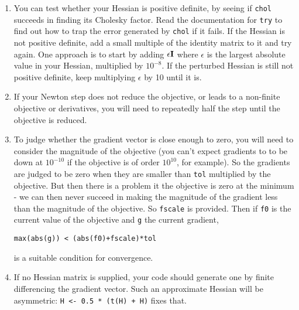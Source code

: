 \documentclass[10pt] {article}
\begin{document}
\begin{enumerate} 
\item You can test whether your Hessian is positive definite, by seeing if {\tt chol} succeeds in finding its Cholesky factor. Read the documentation for {\tt try} to find out how to trap the error generated by {\tt chol} if it fails. If the Hessian is not positive definite, add a small multiple of the identity matrix to it and try again. One approach is to start by adding  $\epsilon {\bf I}$ where $\epsilon $ is the largest absolute value in your Hessian, multiplied by $10^{-8}$. If the perturbed Hessian is still not positive definite, keep multiplying $\epsilon $ by 10 until it is.  
\item If your Newton step does not reduce the objective, or leads to a non-finite objective or derivatives, you will need to repeatedly half the step until the objective is reduced. 
\item To judge whether the gradient vector is close enough to zero, you will need to consider the magnitude of the objective (you can't expect gradients to to be down at $10^{-10}$ if the objective is of order $10^{10}$, for example). So the gradients are judged to be zero when they are smaller than {\tt tol} multiplied by the objective. But then there is a problem it the objective is zero at the minimum - we can then never succeed in making the magnitude of the gradient less than the magnitude of the objective. So {\tt fscale} is provided. Then if {\tt f0} is the current value of the objective and {\tt g} the current gradient, 
\begin{verbatim}
max(abs(g)) < (abs(f0)+fscale)*tol
\end{verbatim}
is a suitable condition for convergence.
\item If no Hessian matrix is supplied, your code should generate one by finite differencing the gradient vector. Such an approximate Hessian will be asymmetric: \verb^H <- 0.5 * (t(H) + H)^ fixes that.
\end{enumerate}

\bigskip
\end{document}
